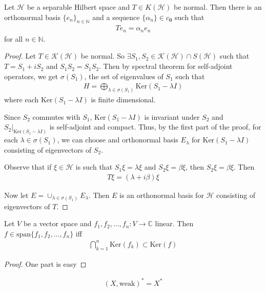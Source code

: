 \begin{theorem}
  Let $\mathcal{H}$ be a separable Hilbert space and $T \in K(\mathcal{H})$ be
  normal. Then there is an orthonormal basis $ \{ e_n \}_{n \in
  \mathbb{N}}$ and a sequence $\{\alpha_n\} \in c_{\textbf{0}}$ such that
  \begin{align*}
    T e_n = \alpha_n e_n
  \end{align*}
  for all $n \in \mathbb{N}$.
\end{theorem}
\begin{proof}
  Let $T \in \mathcal{K}(\mathcal{H})$ be normal. So $\exists S_1,
  S_{2} \in \mathcal{K}(\mathcal{H})\cap S(  \mathcal{H})$ such that
  $T = S_1 + i S_2$ and $S_{1}S_{2} = S_{1}S_{2}$. Then by spectral
  theorem for self-adjoint operators, we get $\sigma(S_{1})$, the set
  of eigenvalues of $S_{1}$ such that
  \begin{align*}
    H = \bigoplus_{\lambda \in \sigma(S_{1})}\textrm{Ker}(S_{1} - \lambda I)
  \end{align*}
  where each $\textrm{Ker}(S_{1} - \lambda I)$ is finite dimensional.

  Since $S_2$ commutes with $S_{1}$, $ \textrm{Ker}(S_{1} - \lambda
  I)$ is invariant under $S_2$ and $S_2|_{\textrm{Ker}(S_{1} -
  \lambda I)}$ is self-adjoint and compact. Thus, by the first part
  of the proof, for each $\lambda \in \sigma(S_1)$, we can choose and
  orthonormal basis $E_\lambda$ for $\textrm{Ker}(S_1 - \lambda I )$
  consisting of eigenvectors of $S_2$.

  Observe that if $\xi \in \mathcal{H}$ is such that $S_{1} \xi
  =\lambda \xi$ and $S_2 \xi = \beta \xi$, then $S_2 \xi = \beta \xi$. Then
  \begin{align*}
    T \xi = (\lambda + i \beta) \xi
  \end{align*}

  Now let $E = \cup_{\lambda \in  \sigma(S_1)} E_\lambda$. Then $E$
  is an orthonormal basis for $\mathcal{H}$ consisting of eigenvectors of $T$.
\end{proof}

\begin{lemma}
  Let $V$ be a vector space and $f_1 , f_2 , \ldots , f_n: V \to
  \mathbb{C}$ linear. Then $ f \in \textrm{span} \{ f_1 , f_2 ,
  \ldots , f_n \}$ iff
  \begin{align*}
    \bigcap_{k = 1}^{n}\textrm{Ker}(f_k) \subset \textrm{Ker}(f)
  \end{align*}
\end{lemma}
\begin{proof}
  One part is easy
\end{proof}

\begin{lemma}
  \begin{align*}
    (X, \textrm{weak})^* = X^*
  \end{align*}
\end{lemma}


